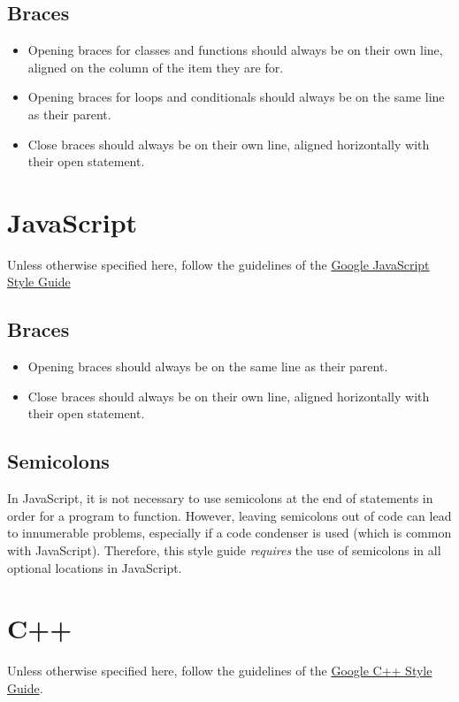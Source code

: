 \documentclass[12pt,letter]{memoir} %
\begin{document}
		\subsection{Braces}
			\begin{itemize}
				\item Opening braces for classes and functions should always be
					on their own line, aligned on the column of the item they
					are for.
				\item Opening braces for loops and conditionals should always be
					on the same line as their parent.
				\item Close braces should always be on their own line, aligned
					horizontally with their open statement.
			\end{itemize}
	\section{JavaScript}
		Unless otherwise specified here, follow the guidelines of the
		\href{http://google-styleguide.googlecode.com/svn/trunk/javascriptguide.xml}{Google JavaScript Style Guide}
		\subsection{Braces}
			\begin{itemize}
				\item Opening braces should always be on the same line as their
					parent.
				\item Close braces should always be on their own line, aligned
					horizontally with their open statement.
			\end{itemize}
		\subsection{Semicolons}
			In JavaScript, it is not necessary to use semicolons at the end of
			statements in order for a program to function. However, leaving
			semicolons out of code can lead to innumerable problems, especially
			if a code condenser is used (which is common with JavaScript).
			Therefore, this style guide \emph{requires} the use of semicolons in
			all optional locations in JavaScript.
	\section{C++}
		Unless otherwise specified here, follow the guidelines of the
		\href{http://google-styleguide.googlecode.com/svn/trunk/cppguide.xml}{Google C++ Style Guide}.
\end{document}
